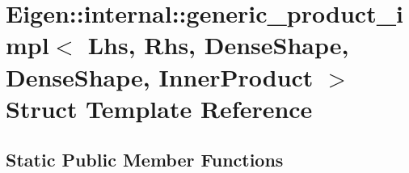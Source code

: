 \hypertarget{struct_eigen_1_1internal_1_1generic__product__impl_3_01_lhs_00_01_rhs_00_01_dense_shape_00_01_dea94f9499d65c14b4f0b179cda95872e3}{}\section{Eigen\+:\+:internal\+:\+:generic\+\_\+product\+\_\+impl$<$ Lhs, Rhs, Dense\+Shape, Dense\+Shape, Inner\+Product $>$ Struct Template Reference}
\label{struct_eigen_1_1internal_1_1generic__product__impl_3_01_lhs_00_01_rhs_00_01_dense_shape_00_01_dea94f9499d65c14b4f0b179cda95872e3}
\subsection*{Static Public Member Functions}
